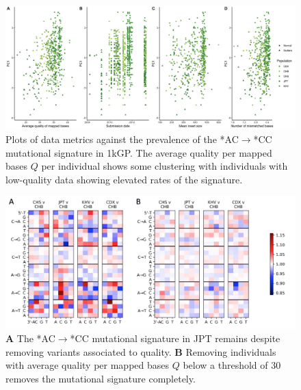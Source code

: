 \documentclass[9pt,lineno]{elife}
\begin{document}
\begin{figure}[h]
\includegraphics[width=\hsize,keepaspectratio]{./Figures/PC1_Correlation.jpg}
\caption{Plots of data metrics against the prevalence of the  *AC${\rightarrow}$*CC mutational signature in 1kGP. The average quality per mapped bases $Q$ per individual shows some clustering with individuals with low-quality data showing elevated rates of the signature.  }
\label{PC1_Correlation}
\end{figure}

\begin{figure}[h]
\includegraphics[width=\hsize,keepaspectratio]{./Figures/MutationSpectrum_cutOff.png}
\caption{\textbf{A} 
The  *AC${\rightarrow}$*CC mutational signature in JPT remains despite removing variants associated to quality.
\textbf{B} 
Removing individuals with average quality per mapped bases $Q$ below a threshold of 30 removes the mutational signature completely. }
\label{MutSpect}
\end{figure}
\end{document}
